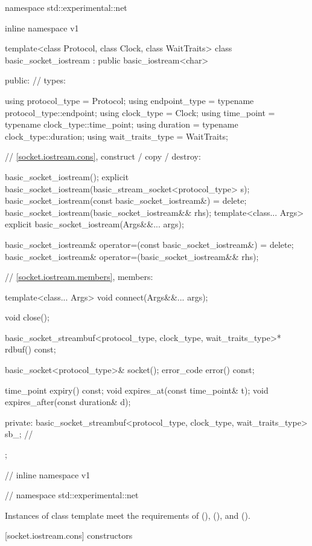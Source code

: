 \begin{codeblock}
namespace std::experimental::net {
inline namespace v1 {

  template<class Protocol, class Clock, class WaitTraits>
  class basic_socket_iostream : public basic_iostream<char>
  {
  public:
    // types:

    using protocol_type = Protocol;
    using endpoint_type = typename protocol_type::endpoint;
    using clock_type = Clock;
    using time_point = typename clock_type::time_point;
    using duration = typename clock_type::duration;
    using wait_traits_type = WaitTraits;

    // \ref{socket.iostream.cons}, construct / copy / destroy:

    basic_socket_iostream();
    explicit basic_socket_iostream(basic_stream_socket<protocol_type> s);
    basic_socket_iostream(const basic_socket_iostream&) = delete;
    basic_socket_iostream(basic_socket_iostream&& rhs);
    template<class... Args>
      explicit basic_socket_iostream(Args&&... args);

    basic_socket_iostream& operator=(const basic_socket_iostream&) = delete;
    basic_socket_iostream& operator=(basic_socket_iostream&& rhs);

    // \ref{socket.iostream.members}, members:

    template<class... Args> void connect(Args&&... args);

    void close();

    basic_socket_streambuf<protocol_type, clock_type, wait_traits_type>* rdbuf() const;

    basic_socket<protocol_type>& socket();
    error_code error() const;

    time_point expiry() const;
    void expires_at(const time_point& t);
    void expires_after(const duration& d);

  private:
    basic_socket_streambuf<protocol_type, clock_type, wait_traits_type> sb_; // \expos
  };

} // inline namespace v1
} // namespace std::experimental::net
\end{codeblock}

\pnum
Instances of class template  meet the requirements of  (),  (), and  ().


[socket.iostream.cons]{ constructors}

